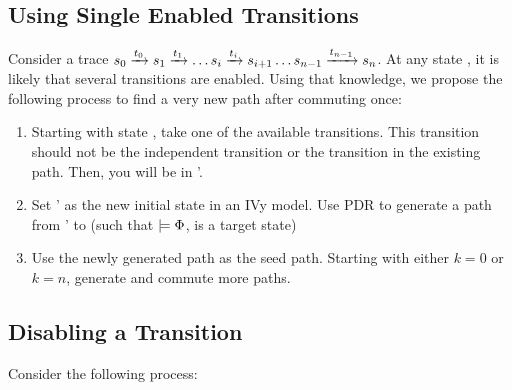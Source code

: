 \subsection{Using Single Enabled Transitions}

Consider a trace \ensuremath{\pathFull}. At any state , it is likely that several transitions are enabled. Using that knowledge, we propose the following process to find a very new path after commuting once:

\begin{enumerate}
	\item Starting with state , take one of the available transitions. This transition should not be the independent transition or the transition in the existing path. Then, you will be in '.
	\item Set ' as the new initial state in an IVy model. Use PDR to generate a path from ' to  (such that  $\models \Phi$,  is a target state)
	\item Use the newly generated path as the seed path. Starting with either $k=0$ or $k=n$, generate and commute more paths.
\end{enumerate}


\subsection{Disabling a Transition}

Consider the following process:

